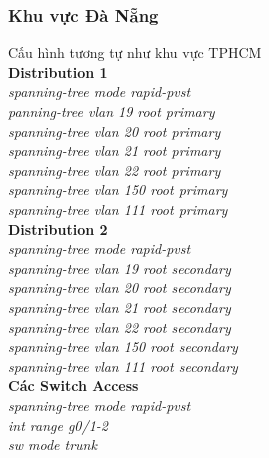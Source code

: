 \documentclass[12pt,a4paper]{report}
\begin{document}
\subsubsection{Khu vực Đà Nẵng}
\hspace*{1cm}Cấu hình tương tự như khu vực TPHCM\\
\hspace*{1cm}\textbf{Distribution 1}\\
\hspace*{2cm}\textit{spanning-tree mode rapid-pvst\\
\hspace*{2cm}panning-tree vlan 19 root primary\\
\hspace*{2cm}spanning-tree vlan 20 root primary\\
\hspace*{2cm}spanning-tree vlan 21 root primary\\
\hspace*{2cm}spanning-tree vlan 22 root primary\\
\hspace*{2cm}spanning-tree vlan 150 root primary\\
\hspace*{2cm}spanning-tree vlan 111 root primary\\}
\hspace*{1cm}\textbf{Distribution 2}\\
\hspace*{2cm}\textit{spanning-tree mode rapid-pvst\\
\hspace*{2cm}spanning-tree vlan 19 root secondary\\
\hspace*{2cm}spanning-tree vlan 20 root secondary\\
\hspace*{2cm}spanning-tree vlan 21 root secondary\\
\hspace*{2cm}spanning-tree vlan 22 root secondary\\
\hspace*{2cm}spanning-tree vlan 150 root secondary\\
\hspace*{2cm}spanning-tree vlan 111 root secondary\\}
\hspace*{1cm}\textbf{Các Switch Access}\\
\hspace*{2cm}\textit{spanning-tree mode rapid-pvst\\
\hspace*{2cm}int range g0/1-2\\
\hspace*{2cm}sw mode trunk\\}
\end{document}
